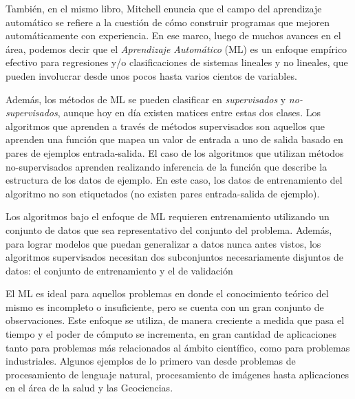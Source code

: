       También, en el mismo libro, Mitchell enuncia que el campo del aprendizaje
      automático se refiere a la cuestión de cómo construir programas
      que mejoren automáticamente con experiencia.
      En ese marco, luego de muchos avances en el área, podemos decir que el
      \textit{Aprendizaje Automático} (ML) es un
      enfoque empírico efectivo para regresiones y/o clasificaciones de sistemas
      lineales y no lineales, que pueden involucrar desde unos pocos hasta varios
      cientos de variables.

    \par Además, los métodos de ML se pueden clasificar en
      \textit{supervisados}\cite{supervised_learning} y
      \textit{no-supervisados}\cite{unsupervised_learning}, aunque hoy en día
      existen matices entre estas dos clases\cite{semi_supervised}.
      Los algoritmos que aprenden a través de métodos supervisados son aquellos que
      aprenden una función que mapea un valor de entrada a uno de salida basado
      en pares de ejemplos entrada-salida.
      El caso de los algoritmos que utilizan métodos no-supervisados aprenden
      realizando inferencia de la función que describe la estructura de los datos
      de ejemplo. En este caso, los datos de entrenamiento del algoritmo no son
      etiquetados (no existen pares entrada-salida de ejemplo).

    \par Los algoritmos bajo el enfoque de ML requieren entrenamiento utilizando un
      conjunto de datos que sea representativo del conjunto del problema.
      Además, para lograr modelos que puedan generalizar a datos nunca antes vistos,
      los algoritmos supervisados necesitan dos subconjuntos necesariamente
      disjuntos de datos: el conjunto de entrenamiento y el de validación\cite{test_val}


    \par El ML es ideal para aquellos problemas en donde el conocimiento teórico del mismo
      es incompleto o insuficiente, pero se cuenta con un gran conjunto de observaciones.
      Este enfoque se utiliza, de manera creciente a medida que pasa el tiempo y
      el poder de cómputo se incrementa, en gran cantidad de aplicaciones tanto para
      problemas más relacionados al ámbito científico, como para problemas
      industriales. Algunos ejemplos de lo primero van desde problemas de
      procesamiento de lenguaje
      natural\cite{twitt_nlp, cardellino, svm_semantic}, procesamiento de
      imágenes\cite{face_detection, corner_detection, handwritting} hasta aplicaciones
      en el área de la salud\cite{nutrition_prediction, bigdata_health, age_estimation, children}
      y las Geociencias\cite{solar_irradiation, ml_grs, modeling_mineral}.

